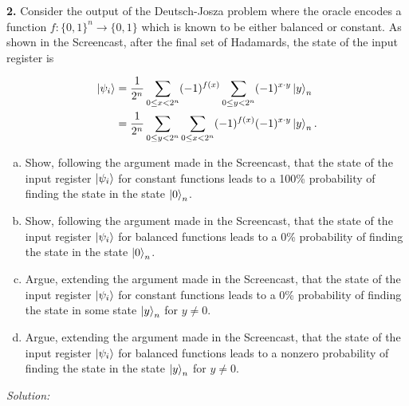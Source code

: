 \documentclass{book}
\theoremstyle{definition}
\newcommand{\nn}{\nonumber}
\newcommand{\f}[2]{\frac{#1}{#2}}
\begin{document}
\newpage



\noindent \textbf{2.} Consider the output of the Deutsch-Josza problem where the oracle encodes a function $f : \{0, 1\}^n \to \{0, 1\}$ which is known to be either balanced or constant. As shown in the Screencast, after the final set of Hadamards, the state of the input register
is

\begin{align}
\ket{\psi_i} &= \f{1}{2^n}\sum_{0 \leq x < 2^n} (-1)^{f(x)} \sum_{0\leq y < 2^n} (-1)^{x\cdot y} \ket{y}_n \nn\\&= \f{1}{2^n} \sum_{0\leq y < 2^n} \sum_{0\leq x < 2^n}(-1)^{f(x)}(-1)^{x\cdot y}\ket{y}_n.
\end{align}
\begin{enumerate}[(a)]
	\item Show, following the argument made in the Screencast, that the state of the input register $\ket{\psi_i}$ for constant functions leads to a 100\% probability of finding the state in the state $\ket{0}_n$.
	
	\item Show, following the argument made in the Screencast, that the state of the input register $\ket{\psi_i}$ for balanced functions leads to a 0\% probability of finding the state in the state $\ket{0}_n$.
	
	\item Argue, extending the argument made in the Screencast, that the state of the input
	register $\ket{\psi_i}$ for constant functions leads to a 0\% probability of finding the state in some state $\ket{y}_n$ for $y \neq 0$.
	
	\item Argue, extending the argument made in the Screencast, that the state of the input
	register $\ket{\psi_i}$ for balanced functions leads to a nonzero probability of finding the state in the state $\ket{y}_n$ for $y \neq 0$.
\end{enumerate}

\noindent \textit{Solution:}
\end{document}

